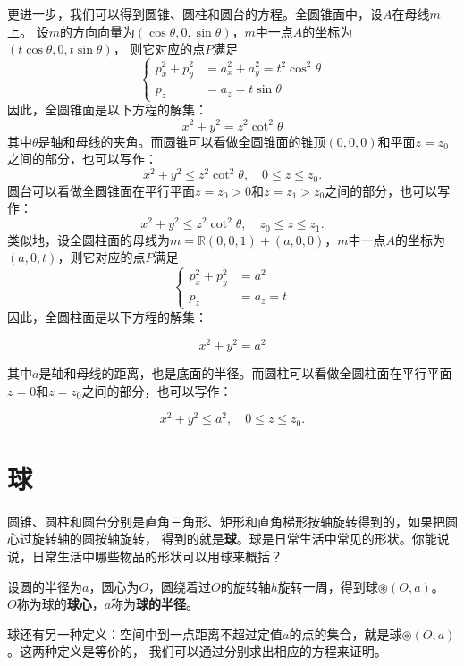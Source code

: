 \documentclass[12pt,UTF8]{ctexbook}
\begin{document}
更进一步，我们可以得到圆锥、圆柱和圆台的方程。全圆锥面中，设$A$在母线$m$上。
设$m$的方向向量为$(\cos{\theta}, 0, \sin{\theta})$，$m$中一点$A$的坐标为$(t\cos{\theta}, 0, t\sin{\theta})$，
则它对应的点$P$满足
$$
\left\{
\begin{array}{rl}
    p_x^2+p_y^2 &= a_x^2+a_y^2 = t^2\cos^2{\theta} \\
    p_z &= a_z = t\sin{\theta}
\end{array}
\right.
$$
因此，全圆锥面是以下方程的解集：
$$ x^2 + y^2 = z^2\cot^2{\theta}$$
其中$\theta$是轴和母线的夹角。而圆锥可以看做全圆锥面的锥顶$( 0,0,0)$和平面$z=z_0$之间的部分，也可以写作：
$$ x^2 + y^2 \leqslant z^2\cot^2{\theta} , \quad 0\leqslant z \leqslant z_0.$$
圆台可以看做全圆锥面在平行平面$z=z_0>0$和$z=z_1 > z_0$之间的部分，也可以写作：
$$ x^2 + y^2 \leqslant z^2\cot^2{\theta} , \quad z_0\leqslant z \leqslant z_1.$$
类似地，设全圆柱面的母线为$m = \mathbb{R}(0,0,1)+(a,0,0)$，$m$中一点$A$的坐标为$(a, 0, t)$，则它对应的点$P$满足
$$
\left\{
\begin{array}{rl}
    p_x^2+p_y^2 &= a^2 \\
    p_z &= a_z = t
\end{array}
\right.
$$
因此，全圆柱面是以下方程的解集：

$$ x^2 + y^2 = a^2$$

其中$a$是轴和母线的距离，也是底面的半径。而圆柱可以看做全圆柱面在平行平面$z=0$和$z=z_0$之间的部分，也可以写作：

$$ x^2 + y^2 \leqslant a^2 , \quad 0\leqslant z \leqslant z_0.$$


\section{球}

圆锥、圆柱和圆台分别是直角三角形、矩形和直角梯形按轴旋转得到的，如果把圆心过旋转轴的圆按轴旋转，
得到的就是\textbf{球}。球是日常生活中常见的形状。你能说说，日常生活中哪些物品的形状可以用球来概括？

设圆的半径为$a$，圆心为$O$，圆绕着过$O$的旋转轴$h$旋转一周，得到球$\circledast(O,a)$。
$O$称为球的\textbf{球心}，$a$称为\textbf{球的半径}。

球还有另一种定义：空间中到一点距离不超过定值$a$的点的集合，就是球$\circledast(O,a)$。这两种定义是等价的，
我们可以通过分别求出相应的方程来证明。
\end{document}
